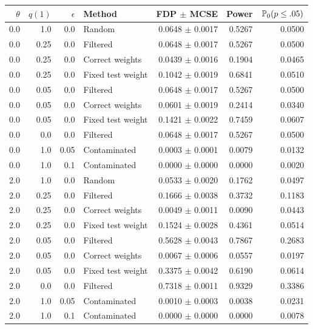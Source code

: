 \begin{tabular}{rrrlrrr}\toprule $\theta$ & $q(1)$ & $\epsilon$ & Method & FDP $\pm$ MCSE & Power & $\mathbb{P}_0(p\le.05)$\\\midrule
0.0 & 1.0 & 0.0 & Random & 0.0648 $\pm$ 0.0017 & 0.5267 & 0.0500 \\
0.0 & 0.25 & 0.0 & Filtered & 0.0648 $\pm$ 0.0017 & 0.5267 & 0.0500 \\
0.0 & 0.25 & 0.0 & Correct weights & 0.0439 $\pm$ 0.0016 & 0.1904 & 0.0465 \\
0.0 & 0.25 & 0.0 & Fixed test weight & 0.1042 $\pm$ 0.0019 & 0.6841 & 0.0510 \\
0.0 & 0.05 & 0.0 & Filtered & 0.0648 $\pm$ 0.0017 & 0.5267 & 0.0500 \\
0.0 & 0.05 & 0.0 & Correct weights & 0.0601 $\pm$ 0.0019 & 0.2414 & 0.0340 \\
0.0 & 0.05 & 0.0 & Fixed test weight & 0.1421 $\pm$ 0.0022 & 0.7459 & 0.0607 \\
0.0 & 0.0 & 0.0 & Filtered & 0.0648 $\pm$ 0.0017 & 0.5267 & 0.0500 \\
0.0 & 1.0 & 0.05 & Contaminated & 0.0003 $\pm$ 0.0001 & 0.0079 & 0.0132 \\
0.0 & 1.0 & 0.1 & Contaminated & 0.0000 $\pm$ 0.0000 & 0.0000 & 0.0020 \\
2.0 & 1.0 & 0.0 & Random & 0.0533 $\pm$ 0.0020 & 0.1762 & 0.0497 \\
2.0 & 0.25 & 0.0 & Filtered & 0.1666 $\pm$ 0.0038 & 0.3732 & 0.1183 \\
2.0 & 0.25 & 0.0 & Correct weights & 0.0049 $\pm$ 0.0011 & 0.0090 & 0.0443 \\
2.0 & 0.25 & 0.0 & Fixed test weight & 0.1524 $\pm$ 0.0028 & 0.4361 & 0.0514 \\
2.0 & 0.05 & 0.0 & Filtered & 0.5628 $\pm$ 0.0043 & 0.7867 & 0.2683 \\
2.0 & 0.05 & 0.0 & Correct weights & 0.0067 $\pm$ 0.0006 & 0.0557 & 0.0197 \\
2.0 & 0.05 & 0.0 & Fixed test weight & 0.3375 $\pm$ 0.0042 & 0.6190 & 0.0614 \\
2.0 & 0.0 & 0.0 & Filtered & 0.7318 $\pm$ 0.0011 & 0.9329 & 0.3386 \\
2.0 & 1.0 & 0.05 & Contaminated & 0.0010 $\pm$ 0.0003 & 0.0038 & 0.0231 \\
2.0 & 1.0 & 0.1 & Contaminated & 0.0000 $\pm$ 0.0000 & 0.0000 & 0.0078 \\
\bottomrule\end{tabular}
